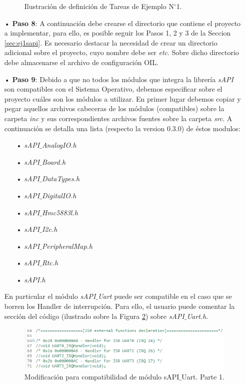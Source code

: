 \documentclass[12pt,letterpaper]{article}
\begin{document}
\begin{enumerate}
\begin{figure}[H]
\caption{Ilustración de definición de Tareas de Ejemplo N$^{\circ}$1.}
\label{Fig39}
\end{figure}
\item[•]\textbf{Paso 8}: A continuación debe crearse el directorio que contiene el proyecto a implementar, para ello, es posible seguir los Pasos 1, 2 y 3 de la Seccion \ref{sec:ej1sapi}. Es necesario destacar la necesidad de crear un directorio adicional sobre el proyecto, cuyo nombre debe ser \textit{etc}. Sobre dicho directorio debe almacenarse el archivo de configuración OIL. 
\item[•]\textbf{Paso 9}: Debido a que no todos los módulos que integra la librería \textit{sAPI} son compatibles con el Sistema Operativo, debemos especificar sobre el proyecto cuáles son los módulos a utilizar. En primer lugar debemos copiar y pegar aquellos archivos cabeceras de los módulos (compatibles) sobre la carpeta \textit{inc} y sus correspondientes archivos fuentes sobre la carpeta \textit{src}. A continuación se detalla una lista (respecto la version 0.3.0) de éstos modulos:
\begin{enumerate}
\item[•]\textit{sAPI$\_$AnalogIO.h}
\item[•]\textit{sAPI$\_$Board.h}
\item[•]\textit{sAPI$\_$DataTypes.h}
\item[•]\textit{sAPI$\_$DigitalIO.h}
\item[•]\textit{sAPI$\_$Hmc5883l.h}
\item[•]\textit{sAPI$\_$I2c.h}
\item[•]\textit{sAPI$\_$PeripheralMap.h}
\item[•]\textit{sAPI$\_$Rtc.h}
\item[•]\textit{sAPI.h}
\end{enumerate}
En particular el módulo \textit{sAPI$\_$Uart} puede ser compatible en el caso que se borren los Handler de interrupción. Para ello, el usuario puede comentar la sección del código (ilustrado sobre la Figura \ref{modificacionuart}) sobre \textit{sAPI$\_$Uart.h}.
\begin{figure}[H]
\centering
\includegraphics[width=10 cm]{figuras/f29.png}
\caption{Modificación para compatibilidad de módulo sAPI$\_$Uart. Parte 1.}
\label{modificacionuart}
\end{figure}


\end{enumerate}
\end{document}
